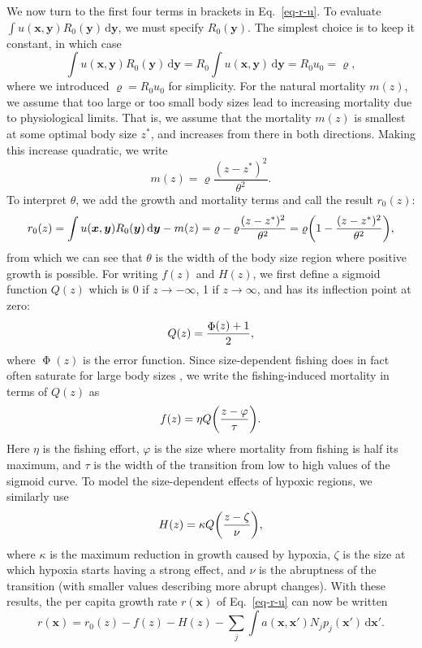 \documentclass[9pt,twoside,lineno]{pnas-new}
\DeclareMathOperator\erf{\Phi}
\newcommand{\ud}{\text{d}}
\let\originalleft\left
\let\originalright\right
\renewcommand{\left}{\mathopen{}\mathclose\bgroup\originalleft}
\renewcommand{\right}{\aftergroup\egroup\originalright}
\newcommand{\mat}[1]{\bm{#1}}
\begin{document}
We now turn to the first four terms in brackets in Eq.~\ref{eq-r-u}. To evaluate $\int u(\mat{x}, \mat{y}) R_0(\mat{y}) \,\ud\mat{y}$, we must specify $R_0(\mat{y})$. The simplest choice is to keep it constant, in which case
\begin{equation}
  \label{eq-uR0}
  \int u(\mat{x}, \mat{y}) R_0(\mat{y}) \,\ud\mat{y}
  = R_0 \int u(\mat{x}, \mat{y}) \,\ud\mat{y}
  = R_0 u_0
  = \varrho ,
\end{equation}
where we introduced $\varrho = R_0 u_0$ for simplicity. For the natural mortality $m(z)$, we assume that too large or too small body sizes lead to increasing mortality due to physiological limits. That is, we assume that the mortality $m(z)$ is smallest at some optimal body size $z^*$, and increases from there in both directions. Making this increase quadratic, we write
\begin{equation}
  \label{eq-m}
  m(z) = \varrho \frac{(z-z^*)^2}{\theta^{2}} .
\end{equation}
To interpret $\theta$, we add the growth and mortality terms and call the result $r_0(z)$:
\begin{equation}
  \label{eq-r0}
  r_0(z)
  = \int u(\mat{x}, \mat{y}) R_0(\mat{y}) \,\ud\mat{y} - m(z)
  = \varrho - \varrho \frac{(z-z^*)^2}{\theta^{2}}
  = \varrho \left( 1 - \frac{(z-z^*)^2}{\theta^{2}} \right) ,
\end{equation}
from which we can see that $\theta$ is the width of the body size region where positive growth is possible. For writing $f(z)$ and $H(z)$, we first define a sigmoid function $Q(z)$ which is 0 if $z \to -\infty$, 1 if $z \to \infty$, and has its inflection point at zero:
\begin{equation}
  \label{eq-sigmoid}
  Q(z) = \frac{\erf\left(z\right) + 1}{2} ,
\end{equation}
where $\erf(z)$ is the error function. Since size-dependent fishing does in fact often saturate for large body sizes \cite{Brinkhof2020}, we write the fishing-induced mortality in terms of $Q(z)$ as
\begin{equation}
  \label{eq-fishing}
  f(z) = \eta Q\left( \frac{z - \varphi}{\tau} \right) .
\end{equation}
Here $\eta$ is the fishing effort, $\varphi$ is the size where mortality from fishing is half its maximum, and $\tau$ is the width of the transition from low to high values of the sigmoid curve. To model the size-dependent effects of hypoxic regions, we similarly use
\begin{equation}
  \label{eq-hypoxia}
  H(z) = \kappa Q\left( \frac{z-\zeta}{\nu} \right) ,
\end{equation}
where $\kappa$ is the maximum reduction in growth caused by hypoxia, $\zeta$ is the size at which hypoxia starts having a strong effect, and $\nu$ is the abruptness of the transition (with smaller values describing more abrupt changes). With these results, the per capita growth rate $r(\mat{x})$ of Eq.~\ref{eq-r-u} can now be written
\begin{equation}
  \label{eq-r-sub}
  r(\mat{x})
  = r_0(z) - f(z) - H(z)
  - \sum_j\int a(\mat{x},\mat{x}') N_j p_j(\mat{x}')\,\ud\mat{x}' .
\end{equation}
\end{document}
